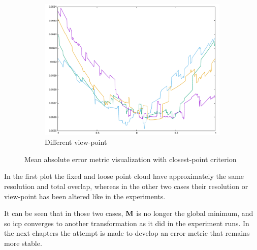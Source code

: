\begin{figure}[H]
\begin{subfigure}{.33\textwidth}
	\includegraphics[width=\linewidth]{fig/relief_dproj_err.pdf}
	\caption{Different view-point}
\end{subfigure}
\caption{Mean absolute error metric visualization with closest-point criterion}
\label{fig:relief_err}
\end{figure}

In the first plot the fixed and loose point cloud have approximately the same resolution and total overlap, whereas in the other two cases their resolution or view-point has been altered like in the experiments.

It can be seen that in those two cases, $\mathbf{M}$ is no longer the global minimum, and so \gls{icp} converges to another transformation as it did in the experiment runs. In the next chapters the attempt is made to develop an error metric that remains more stable.
